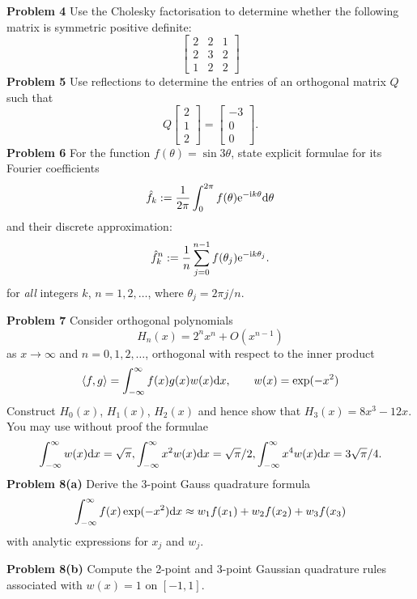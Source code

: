 \documentclass[12pt,a4paper]{article}
\begin{document}
\textbf{Problem 4} Use the Cholesky factorisation to determine whether the following matrix is symmetric positive definite:
\[
\begin{bmatrix} 2 & 2 & 1  \\
2 & 3 & 2\\
1 & 2 & 2
\end{bmatrix}
\]
\textbf{Problem 5} Use reflections to determine the entries of an orthogonal matrix $Q$ such that
\[
Q \begin{bmatrix} 2 \\ 1 \\ 2 \end{bmatrix} =  \begin{bmatrix} -3 \\ 0 \\ 0 \end{bmatrix}.
\]
\textbf{Problem 6} For the function $f(\ensuremath{\theta}) = \sin 3 \ensuremath{\theta}$, state explicit formulae for its Fourier coefficients
\[
\hat f_k := {1 \over 2\ensuremath{\pi}} \int_0^{2\ensuremath{\pi}} f(\ensuremath{\theta}) {\rm e}^{-{\rm i} k \ensuremath{\theta}} {\rm d}\ensuremath{\theta}
\]
and  their discrete approximation:
\[
\hat f_k^n := {1 \over n} \sum_{j=0}^{n-1} f(\ensuremath{\theta}_j) {\rm e}^{-{\rm i} k \ensuremath{\theta}_j}.
\]
for \emph{all} integers $k$, $n = 1,2,\ensuremath{\ldots}$, where $\ensuremath{\theta}_j = 2\ensuremath{\pi} j/n$.

\textbf{Problem 7} Consider orthogonal polynomials
\[
H_n(x) = 2^n x^n + O (x^{n-1})
\]
as $x \ensuremath{\rightarrow} \ensuremath{\infty}$ and $n = 0, 1, 2, \ensuremath{\ldots}$,  orthogonal with respect to the inner product
\[
\langle f, g \rangle = \int_{-\ensuremath{\infty}}^\ensuremath{\infty} f(x) g(x) w(x) {\rm d}x, \qquad w(x) = \exp(-x^2)
\]
Construct $H_0(x)$, $H_1(x)$, $H_2(x)$ and hence show that $H_3(x) = 8x^3-12x$. You may use without proof the formulae
\[
\int_{-\ensuremath{\infty}}^\ensuremath{\infty} w(x) {\rm d}x = \sqrt{\ensuremath{\pi}}, \int_{-\ensuremath{\infty}}^\ensuremath{\infty} x^2 w(x) {\rm d}x = \sqrt{\ensuremath{\pi}}/2,
\int_{-\ensuremath{\infty}}^\ensuremath{\infty} x^4 w(x) {\rm d}x = 3\sqrt{\ensuremath{\pi}}/4.
\]
\textbf{Problem 8(a)} Derive the 3-point Gauss quadrature formula
\[
\int_{-\ensuremath{\infty}}^\ensuremath{\infty} f(x) \exp(-x^2) {\rm d}x \ensuremath{\approx} w_1 f(x_1) + w_2 f(x_2) + w_3 f(x_3)
\]
with analytic expressions for $x_j$ and $w_j$.

\textbf{Problem 8(b)} Compute the 2-point and 3-point Gaussian quadrature rules associated with $w(x) = 1$ on $[-1,1]$.
\end{document}
